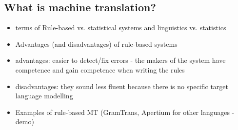 \documentclass[a4paper,english,12pt]{article}
\begin{document}
\begin{spacing}{1.0}
\subsection{What is machine translation?}
\begin{itemize}
\item  terms of Rule-based vs. statistical systems and linguistics vs. statistics
\item    Advantages (and disadvantages) of rule-based systems
\item advantages: easier to detect/fix errors - the makers of the system have competence and gain competence when writing the rules
\item disadvantages: they sound less fluent because there is no specific target language modelling
\item    Examples of rule-based MT (GramTrans, Apertium for other languages - demo)
\end{itemize}


\end{spacing}
\end{document}
